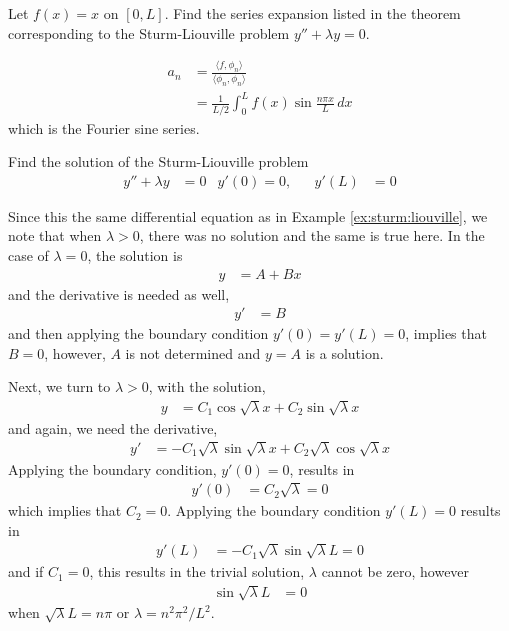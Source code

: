\begin{example}
Let $f(x)=x$ on $[0,L]$.  Find the series expansion listed in the theorem corresponding to the Sturm-Liouville problem $y''+\lambda y= 0$.

\solution

\begin{align*}
a_n & = \frac{ \langle f,\phi_n \rangle}{ \langle \phi_n, \phi_n \rangle} \\
& = \frac{1}{L/2} \int_{0}^L f(x) \sin \frac{n\pi x}{L} \, dx
\end{align*}
which is the Fourier sine series.

\end{example}


\begin{example} \label{ex:sturm:liouville:2}
Find the solution of the Sturm-Liouville problem
%
\begin{align*}
y'' + \lambda y &= 0 & y'(0) = 0, && y'(L) & = 0
\end{align*}

\solution

Since this the same differential equation as in Example \ref{ex:sturm:liouville}, we note that when $\lambda>0$, there was no solution and the same is true here.  In the case of $\lambda=0$, the solution is
%
\begin{align*}
y & = A+Bx
\end{align*}
and the derivative is needed as well,
%
\begin{align*}
y' & = B
\end{align*}
and then applying the boundary condition $y'(0)=y'(L)=0$, implies that $B=0$, however, $A$ is not determined and $y=A$ is a solution.

Next, we turn to  $\lambda>0$, with the solution,
%
\begin{align*}
y & = C_1 \cos \sqrt{\lambda} x + C_2 \sin \sqrt{\lambda} x
\end{align*}
and again, we need the derivative,
%
\begin{align*}
y' & = - C_1 \sqrt{\lambda} \sin \sqrt{\lambda} x + C_2 \sqrt{\lambda} \cos \sqrt{\lambda} x
\end{align*}
Applying the boundary condition, $y'(0)=0$, results in
%
\begin{align*}
y'(0) & = C_2 \sqrt{\lambda} = 0
\end{align*}
which implies that $C_2=0$.  Applying the boundary condition $y'(L)=0$ results in
%
\begin{align*}
y'(L) & = -C_1 \sqrt{\lambda} \sin \sqrt{\lambda} L = 0
\end{align*}
and if $C_1=0$, this results in the trivial solution, $\lambda$ cannot be zero, however
%
\begin{align*}
\sin \sqrt{\lambda} L & = 0
\end{align*}
when $\sqrt{\lambda} L = n \pi$ or $\lambda = n^2 \pi^2/L^2$.


\end{example}
